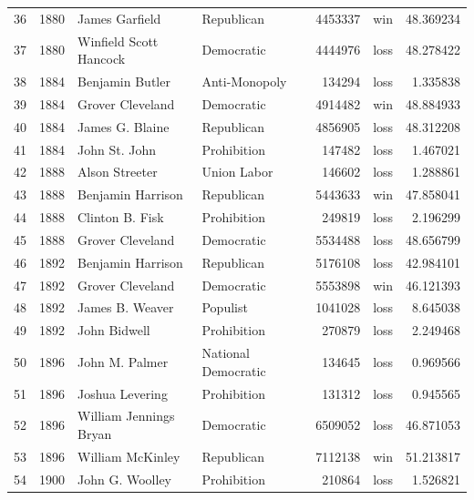 \documentclass[
  letterpaper,
  DIV=11,
  numbers=noendperiod]{scrreprt}
\begin{document}
\begin{tabular}{lrllrlr}
36  &  1880 &          James Garfield &             Republican &       4453337 &    win &  48.369234 \\
37  &  1880 &  Winfield Scott Hancock &             Democratic &       4444976 &   loss &  48.278422 \\
38  &  1884 &         Benjamin Butler &          Anti-Monopoly &        134294 &   loss &   1.335838 \\
39  &  1884 &        Grover Cleveland &             Democratic &       4914482 &    win &  48.884933 \\
40  &  1884 &         James G. Blaine &             Republican &       4856905 &   loss &  48.312208 \\
41  &  1884 &           John St. John &            Prohibition &        147482 &   loss &   1.467021 \\
42  &  1888 &          Alson Streeter &            Union Labor &        146602 &   loss &   1.288861 \\
43  &  1888 &       Benjamin Harrison &             Republican &       5443633 &    win &  47.858041 \\
44  &  1888 &         Clinton B. Fisk &            Prohibition &        249819 &   loss &   2.196299 \\
45  &  1888 &        Grover Cleveland &             Democratic &       5534488 &   loss &  48.656799 \\
46  &  1892 &       Benjamin Harrison &             Republican &       5176108 &   loss &  42.984101 \\
47  &  1892 &        Grover Cleveland &             Democratic &       5553898 &    win &  46.121393 \\
48  &  1892 &         James B. Weaver &               Populist &       1041028 &   loss &   8.645038 \\
49  &  1892 &            John Bidwell &            Prohibition &        270879 &   loss &   2.249468 \\
50  &  1896 &          John M. Palmer &    National Democratic &        134645 &   loss &   0.969566 \\
51  &  1896 &         Joshua Levering &            Prohibition &        131312 &   loss &   0.945565 \\
52  &  1896 &  William Jennings Bryan &             Democratic &       6509052 &   loss &  46.871053 \\
53  &  1896 &        William McKinley &             Republican &       7112138 &    win &  51.213817 \\
54  &  1900 &         John G. Woolley &            Prohibition &        210864 &   loss &   1.526821 \\

\end{tabular}
\end{document}

